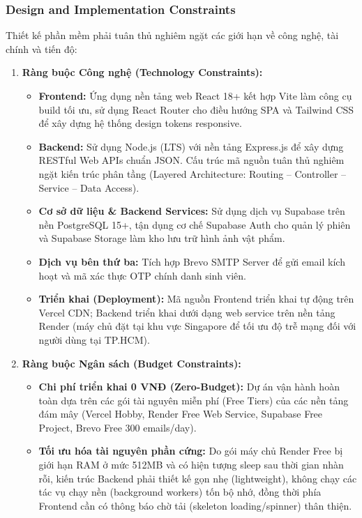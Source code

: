 \subsubsection{Design and Implementation Constraints}

Thiết kế phần mềm phải tuân thủ nghiêm ngặt các giới hạn về công nghệ, tài chính và tiến độ:

\begin{enumerate}[label=\arabic*.,leftmargin=1.5em,itemsep=5pt]
  \item \textbf{Ràng buộc Công nghệ (Technology Constraints):}
  \begin{itemize}[label=\textbullet,leftmargin=1.2em,itemsep=3pt]
    \item \textbf{Frontend:} Ứng dụng nền tảng web React 18+ kết hợp Vite làm công cụ build tối ưu, sử dụng React Router cho điều hướng SPA và Tailwind CSS để xây dựng hệ thống design tokens responsive.
    \item \textbf{Backend:} Sử dụng Node.js (LTS) với nền tảng Express.js để xây dựng RESTful Web APIs chuẩn JSON. Cấu trúc mã nguồn tuân thủ nghiêm ngặt kiến trúc phân tầng (Layered Architecture: Routing -- Controller -- Service -- Data Access).
    \item \textbf{Cơ sở dữ liệu \& Backend Services:} Sử dụng dịch vụ Supabase trên nền PostgreSQL 15+, tận dụng cơ chế Supabase Auth cho quản lý phiên và Supabase Storage làm kho lưu trữ hình ảnh vật phẩm.
    \item \textbf{Dịch vụ bên thứ ba:} Tích hợp Brevo SMTP Server để gửi email kích hoạt và mã xác thực OTP chính danh sinh viên.
    \item \textbf{Triển khai (Deployment):} Mã nguồn Frontend triển khai tự động trên Vercel CDN; Backend triển khai dưới dạng web service trên nền tảng Render (máy chủ đặt tại khu vực Singapore để tối ưu độ trễ mạng đối với người dùng tại TP.HCM).
  \end{itemize}

  \item \textbf{Ràng buộc Ngân sách (Budget Constraints):}
  \begin{itemize}[label=\textbullet,leftmargin=1.2em,itemsep=3pt]
    \item \textbf{Chi phí triển khai 0 VNĐ (Zero-Budget):} Dự án vận hành hoàn toàn dựa trên các gói tài nguyên miễn phí (Free Tiers) của các nền tảng đám mây (Vercel Hobby, Render Free Web Service, Supabase Free Project, Brevo Free 300 emails/day).
    \item \textbf{Tối ưu hóa tài nguyên phần cứng:} Do gói máy chủ Render Free bị giới hạn RAM ở mức 512MB và có hiện tượng sleep sau thời gian nhàn rỗi, kiến trúc Backend phải thiết kế gọn nhẹ (lightweight), không chạy các tác vụ chạy nền (background workers) tốn bộ nhớ, đồng thời phía Frontend cần có thông báo chờ tải (skeleton loading/spinner) thân thiện.
  \end{itemize}


\end{enumerate}
